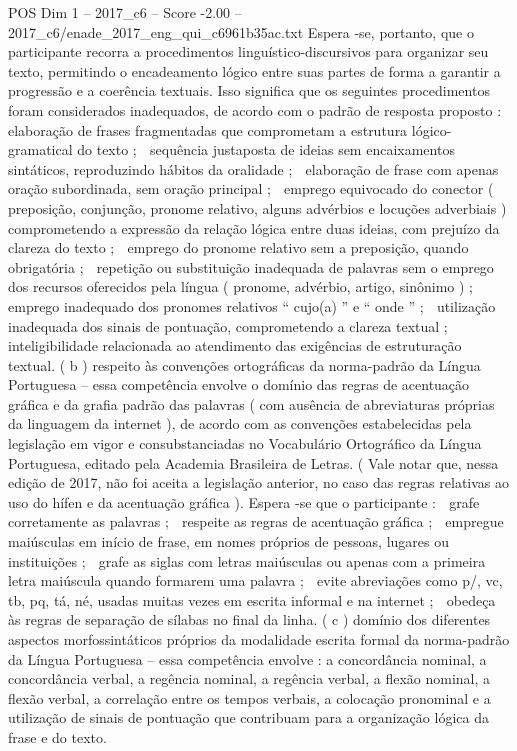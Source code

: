 \begin{textsample}{POS Dim 1 – 2017\_c6 – Score -2.00 – 2017\_c6/enade\_2017\_eng\_qui\_c6961b35ac.txt}
Espera -se, portanto, que o participante recorra a procedimentos linguístico-discursivos para organizar seu texto, permitindo o encadeamento lógico entre suas partes de forma a garantir a progressão e a coerência textuais.
Isso significa que os seguintes procedimentos foram considerados inadequados, de acordo com o padrão de resposta proposto :  elaboração de frases fragmentadas que comprometam a estrutura lógico-gramatical do texto ;  sequência justaposta de ideias sem encaixamentos sintáticos, reproduzindo hábitos da oralidade ;  elaboração de frase com apenas oração subordinada, sem oração principal ;  emprego equivocado do conector ( preposição, conjunção, pronome relativo, alguns advérbios e locuções adverbiais ) comprometendo a expressão da relação lógica entre duas ideias, com prejuízo da clareza do texto ;  emprego do pronome relativo sem a preposição, quando obrigatória ;  repetição ou substituição inadequada de palavras sem o emprego dos recursos oferecidos pela língua ( pronome, advérbio, artigo, sinônimo ) ;  emprego inadequado dos pronomes relativos “ cujo(a) ” e “ onde ” ;  utilização inadequada dos sinais de pontuação, comprometendo a clareza textual ;  inteligibilidade relacionada ao atendimento das exigências de estruturação textual. ( b ) respeito às convenções ortográficas da norma-padrão da Língua Portuguesa – essa competência envolve o domínio das regras de acentuação gráfica e da grafia padrão das palavras ( com ausência de abreviaturas próprias da linguagem da internet ), de acordo com as convenções estabelecidas pela legislação em vigor e consubstanciadas no Vocabulário Ortográfico da Língua Portuguesa, editado pela Academia Brasileira de Letras. ( Vale notar que, nessa edição de 2017, não foi aceita a legislação anterior, no caso das regras relativas ao uso do hífen e da acentuação gráfica ).
Espera -se que o participante :  grafe corretamente as palavras ;  respeite as regras de acentuação gráfica ;  empregue maiúsculas em início de frase, em nomes próprios de pessoas, lugares ou instituições ;  grafe as siglas com letras maiúsculas ou apenas com a primeira letra maiúscula quando formarem uma palavra ;  evite abreviações como p/, vc, tb, pq, tá, né, usadas muitas vezes em escrita informal e na internet ;  obedeça às regras de separação de sílabas no final da linha. ( c ) domínio dos diferentes aspectos morfossintáticos próprios da modalidade escrita formal da norma-padrão da Língua Portuguesa – essa competência envolve : a concordância nominal, a concordância verbal, a regência nominal, a regência verbal, a flexão nominal, a flexão verbal, a correlação entre os tempos verbais, a colocação pronominal e a utilização de sinais de pontuação que contribuam para a organização lógica da frase e do texto.

\end{textsample}
